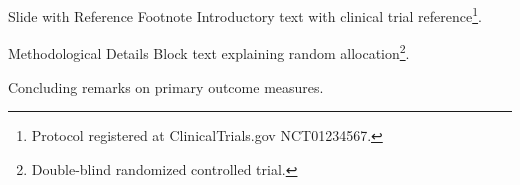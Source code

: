 \documentclass[14pt,t]{beamer}
\begin{document}
\begin{frame}{Slide with Reference Footnote}
Introductory text with clinical trial reference\footnote{Protocol registered at ClinicalTrials.gov NCT01234567.}.

\begin{block}{Methodological Details}
Block text explaining random allocation\footnote{Double-blind randomized controlled trial.}.
\end{block}

Concluding remarks on primary outcome measures.
\end{frame}
\end{document}
